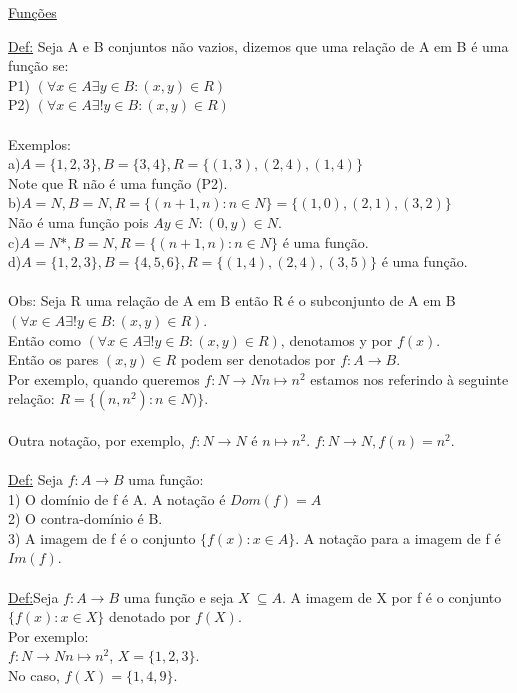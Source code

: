 \documentclass[10pt,a4paper]{article}
\begin{document}
\begin{flushleft}
\underline{Funções }\\
\end{flushleft}
\underline{Def:} Seja A e B conjuntos n\~ao vazios, dizemos que uma relaç\~ao de A em B \'e uma funç\~ao se:\\
P1) $(\forall x \in A \exists y \in B:(x,y)\in R)$\\
P2) $(\forall x \in A \exists ! y \in B:(x,y)\in R)$\\\\
Exemplos:\\
a)$A=\{1, 2, 3\}, B=\{3, 4\}, R=\{(1,3), (2,4), (1,4)\}$ \\
	Note que R n\~ao \'e uma funç\~ao (P2).\\
b)$A=N, B=N, R=\{(n+1, n):n\in N\} = \{(1,0), (2,1), (3,2)\}$\\
N\~ao \'e uma funç\~ao pois $A y\in N:(0,y) \in N$.\\
c)$A=N*, B=N, R=\{(n+1, n):n \in N\}$ \'e uma funç\~ao.\\
d)$A=\{1,2,3\}, B=\{4,5,6\}, R=\{(1,4),(2,4),(3,5)\}$ \'e uma funç\~ao.\\
\\
Obs: Seja R uma relaç\~ao de A em B ent\~ao R \'e o subconjunto de A em B $(\forall x \in A \exists !y \in B:(x,y) \in R)$.\\
Ent\~ao como $(\forall x \in A \exists !y \in B:(x,y) \in R)$, denotamos y por $f(x)$.\\
Ent\~ao os pares $(x,y)\in R$ podem ser denotados por $f:A\longrightarrow B$.\\
Por exemplo, quando queremos $f:N\longrightarrow N n\longmapsto n^2$ estamos nos referindo à seguinte relaç\~ao: $R=\{(n, n^2):n\in N)\}$.\\
 \\
 Outra notaç\~ao, por exemplo, $f:N\longrightarrow N$ \'e $n\longmapsto n^2$. $f:N\longrightarrow N, f(n) = n^2$.\\
 \\
 \underline{Def:} Seja $f:A\longrightarrow B$ uma funç\~ao:\\
 1) O domínio de f \'e A. A notaç\~ao \'e $Dom(f)=A$\\
 2) O contra-domínio \'e B.\\
 3) A imagem de f \'e o conjunto $\{f(x):x\in A\}$. A notaç\~ao para a imagem de f \'e $Im(f)$.\\
\\
\underline{Def:}Seja $f:A\longrightarrow B$ uma funç\~ao e seja $X \ \subseteq A$. A imagem de X por f \'e o conjunto $\{f(x):x\in X\}$ denotado por $f(X)$.\\
Por exemplo:\\
$f:N\longrightarrow N n\longmapsto n^2$, $X=\{1,2,3\}$.\\
No caso, $f(X) = \{1,4,9\}$.
\end{document}
